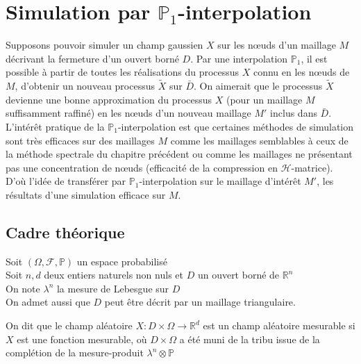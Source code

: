 \chapter{Simulation par $\mathbb{P}_{1}$-interpolation}
\label{P1Interpol}
Supposons pouvoir simuler un champ gaussien $X$
sur les n\oe uds d'un maillage $M$ décrivant la fermeture d'un ouvert borné $D$.
Par une interpolation $\mathbb{P}_1$, il est possible à partir de toutes les réalisations du processus
$X$ connu en les n\oe uds de $M$, d'obtenir un nouveau processus $\tilde{X}$
sur $\bar{D}$. On aimerait que le processus $\tilde{X}$ devienne une bonne
approximation du processus $X$ (pour un maillage $M$ suffisamment raffiné)
en les n\oe uds d'un nouveau maillage $M'$ inclus dans $\bar{D}$.\\

L'intérêt pratique de la $\mathbb{P}_{1}$-interpolation est que certaines méthodes de simulation
sont très efficaces sur des maillages $M$ comme les maillages
semblables à ceux de la méthode spectrale du chapitre précédent ou
comme les maillages ne présentant pas une concentration de n\oe uds
(efficacité de la compression en $\mathcal{H}$-matrice). D'où l'idée
de transférer par $\mathbb{P}_{1}$-interpolation sur
le maillage d'intérêt $M'$, les résultats d'une simulation efficace
sur $M$.\\

\section{Cadre théorique}
\label{theory}
\noindent Soit $(\Omega,\mathcal{F},\mathbb{P})$ un espace probabilisé \\
Soit $n,d$ deux entiers naturels non nuls et $D$ un ouvert borné de $\mathbb{R}^n$  \\
On note $\lambda^n$ la mesure de Lebesgue sur $D$\\
On admet aussi que $D$ peut être décrit par un maillage triangulaire.



\begin{definition}
\label{RFmesurable}On dit que le champ aléatoire $X : D \times \Omega \rightarrow \mathbb{R}^d$ est un
champ aléatoire mesurable si $X$ est une fonction mesurable, où $D \times \Omega$
a été muni de la tribu issue de la complétion de la mesure-produit $\lambda^n \otimes \mathbb{P}$ 
\end{definition}

